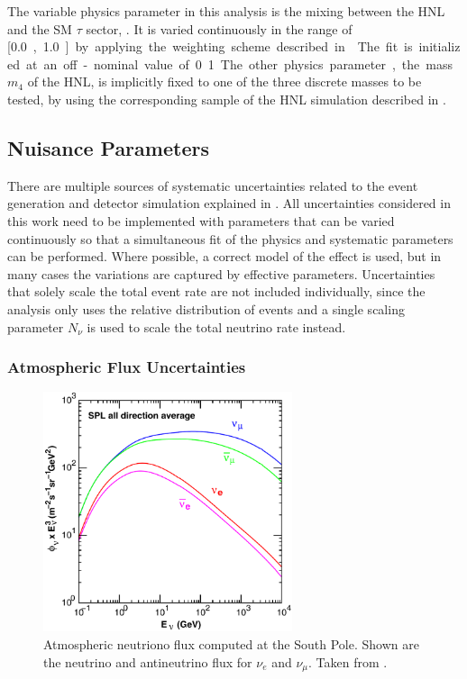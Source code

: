 The variable physics parameter in this analysis is the mixing between the HNL and the SM $\tau$ sector, . It is varied continuously in the range of [\SI{0.0}, \SI{1.0}] by applying the weighting scheme described in . The fit is initialized at an off-nominal value of 0.1. The other physics parameter, the mass $m_4$ of the HNL, is implicitly fixed to one of the three discrete masses to be tested, by using the corresponding sample of the HNL simulation described in .


\subsection{Nuisance Parameters} 

There are multiple sources of systematic uncertainties related to the event generation and detector simulation explained in . All uncertainties considered in this work need to be implemented with parameters that can be varied continuously so that a simultaneous fit of the physics and systematic parameters can be performed. Where possible, a correct model of the effect is used, but in many cases the variations are captured by effective parameters. Uncertainties that solely scale the total event rate are not included individually, since the analysis only uses the relative distribution of events and a single scaling parameter $N_{\nu}$ is used to scale the total neutrino rate instead.


\subsubsection{Atmospheric Flux Uncertainties}
\begin{figure}[h]
    \centering 
    \includegraphics[width=0.65\textwidth]{figures/simulation_and_processing/flux/honda_flux_spl.png}
    \caption[South pole atmospheric neutrino flux]{Atmospheric neutriono flux computed at the South Pole. Shown are the neutrino and antineutrino flux for $\nu_e$ and $\nu_\mu$. Taken from \cite{PhysRevD.92.023004_Honda_Flux}.}
\end{figure}


